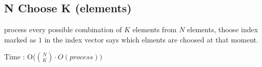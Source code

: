 \subsection{N Choose K (elements)}

process every possible combination of $K$ elements from $N$ elements, thoose index marked as $1$ in the index vector says which elments are choosed at that moment.

Time : O($\binom{N}{K} \cdot O(process))$

